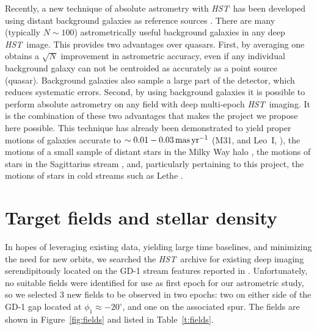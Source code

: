 \documentclass[12pt]{article}
\newcommand{\hst}{\textsl{HST}}
\begin{document}
Recently, a new technique of absolute astrometry with \hst\ has been developed using distant background galaxies as reference sources \parencite[e.g.,][]{mahmud2008, sohn2012,sohn2013}.
There are many (typically $N\sim100$) astrometrically useful background galaxies in any deep \hst\ image.
This provides two advantages over quasars.
First, by averaging one obtains a $\sqrt{N}$ improvement in astrometric accuracy, even if any individual background galaxy can not be centroided as accurately as a point source (quasar).
Background galaxies also sample a large part of the detector, which reduces systematic errors.
Second, by using background galaxies it is possible to perform absolute astrometry on any field with deep multi-epoch \hst\ imaging.
It is the combination of these two advantages that makes the project we propose here possible.
This technique has already been demonstrated to yield proper motions of galaxies accurate to $\sim0.01-0.03\,\rm mas\,yr^{-1}$ (M31, \cite{sohn2012,vdmarel2012a,vdmarel2012b} and Leo~I, \cite{sohn2013}), the motions of a small sample of distant stars in the Milky Way halo \parencite{deason2013}, the motions of stars in the Sagittarius stream \parencite{sohn2015}, and, particularly pertaining to this project, the motions of stars in cold streams such as Lethe \parencite[Figure~\ref{fig:lethe},][]{sohn2016}.


\section*{Target fields and stellar density}
In hopes of leveraging existing data, yielding large time baselines, and minimizing the need for new orbits, we searched the \hst\ archive for existing deep imaging serendipitously located on the GD-1 stream features reported in \textcite{pwb2018}.
Unfortunately, no suitable fields were identified for use as first epoch for our astrometric study, so we selected 3 new fields to be observed in two epochs: two on either side of the GD-1 gap located at $\phi_1\approx-20^\circ$, and one on the associated spur.
The fields are shown in Figure~\ref{fig:fields} and listed in Table~\ref{t:fields}.
\end{document}
